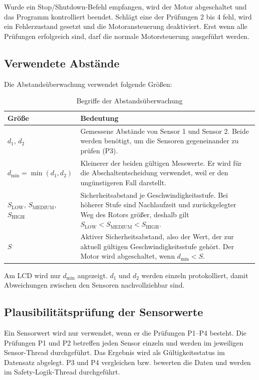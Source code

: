 Wurde ein Stop/Shutdown-Befehl empfangen, wird der Motor abgeschaltet und das
Programm kontrolliert beendet. Schlägt eine der Prüfungen 2 bis 4 fehl, wird ein
Fehlerzustand gesetzt und die Motoransteuerung deaktiviert. Erst wenn alle Prüfungen erfolgreich sind,
darf die normale Motorsteuerung ausgeführt werden.

\subsection{Verwendete Abstände}
\label{sec:distances}

Die Abstandsüberwachung verwendet folgende Größen:

\begin{table}[H]
    \centering
    \small
    \begin{tabularx}{\textwidth}{@{}p{3.6cm}Y@{}}
        \toprule
        \textbf{Größe} & \textbf{Bedeutung} \\
        \midrule
        $d_1$, $d_2$ & Gemessene Abstände von Sensor 1 und Sensor 2. Beide werden benötigt, um die Sensoren gegeneinander zu prüfen (P3). \\
        $d_{\min} = \min(d_1, d_2)$ & Kleinerer der beiden gültigen Messwerte. Er wird für die Abschaltentscheidung verwendet, weil er den ungünstigeren Fall darstellt. \\
        $S_{\mathrm{LOW}}$, $S_{\mathrm{MEDIUM}}$, $S_{\mathrm{HIGH}}$ & Sicherheitsabstand je Geschwindigkeitsstufe. Bei höherer Stufe sind Nachlaufzeit und zurückgelegter Weg des Rotors größer, deshalb gilt $S_{\mathrm{LOW}} < S_{\mathrm{MEDIUM}} < S_{\mathrm{HIGH}}$. \\
        $S$ & Aktiver Sicherheitsabstand, also der Wert, der zur aktuell gültigen Geschwindigkeitsstufe gehört. Der Motor wird abgeschaltet, wenn $d_{\min} < S$. \\
        \bottomrule
    \end{tabularx}
    \caption{Begriffe der Abstandsüberwachung}
\end{table}

Am LCD wird nur $d_{\min}$ angezeigt. $d_1$ und $d_2$ werden einzeln
protokolliert, damit Abweichungen zwischen den Sensoren nachvollziehbar sind.

\subsection{Plausibilitätsprüfung der Sensorwerte}
\label{sec:plausibility}

Ein Sensorwert wird nur verwendet, wenn er die Prüfungen P1--P4 besteht. Die
Prüfungen P1 und P2 betreffen jeden Sensor einzeln und werden im jeweiligen
Sensor-Thread durchgeführt. Das Ergebnis wird als Gültigkeitsstatus im
Datensatz abgelegt. P3 und P4 vergleichen bzw. bewerten die Daten und werden im
Safety-Logik-Thread durchgeführt.

